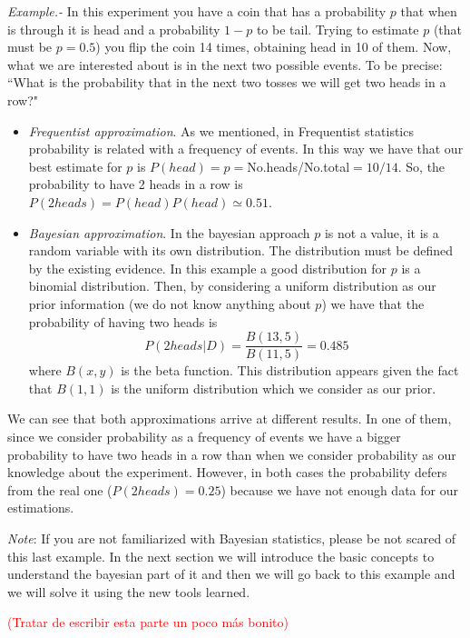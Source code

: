 \documentclass[onecolumn,           %
               showpacs,            %
               preprintnumbers,     %
               aps,                 %
               prl,          	    %
               letterpaper,             %
               superscriptaddress,      %
               nofootinbib,         %
               tightenlines,        %
               floats,floatfix      %
               ,usenatbib,
               ]{revtex4-1}
\begin{document}
\textit{Example.-} In this experiment  you have a coin that has a probability $p$ that when is through it is head and a probability $1-p$ to be tail. Trying to estimate $p$ (that must be $p=0.5$) you flip the coin 14 times, obtaining head in 10 of them. Now, what we are interested about is in the next two possible events. To be precise: ``What is the probability that in the next two tosses we will get two heads in a row?"
\begin{itemize}
\item \textit{Frequentist approximation}. As we mentioned, in Frequentist statistics probability is related with a frequency of events. In this way we have that our best estimate for $p$ is $P(head)=p=$No.heads/No.total$=10/14$. So, the probability to have 2 heads in a row is $P(2heads)=P(head)P(head)\simeq 0.51$.  
\item \textit{Bayesian approximation}. In the bayesian approach $p$ is not a value, it is a random variable with its own distribution. The distribution must be defined by the existing evidence. In this example a good distribution for $p$ is a binomial distribution. Then, by considering a uniform distribution as our prior information (we do not know anything about $p$) we have that the probability of having two heads is
\[
P(2heads|D)=\frac{B(13,5)}{B(11,5)}=0.485
\]
where $B(x,y)$ is the beta function. This distribution appears given the fact that $B(1,1)$ is the uniform distribution which we consider as our prior.
\end{itemize}

We can see that both approximations arrive at different results. In one of them, since we consider probability as a frequency of events we have a bigger probability to have two heads in a row than when we consider probability as our knowledge about the experiment. However, in both cases the probability defers from the real one ($P(2heads)=0.25$) because we have not enough data for our estimations.

\textit{Note}: If you are not familiarized with Bayesian statistics,  please be not scared of this last example. In the next section we will introduce the basic concepts to understand the bayesian part of it and then we will go back to this example and we will solve it using the new tools learned.   

\textcolor{red}{(Tratar de escribir esta parte un poco m\'as bonito)}
\end{document}
